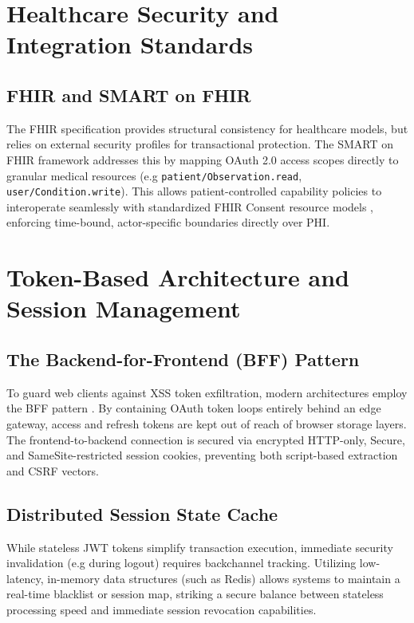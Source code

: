 \section{Healthcare Security and Integration Standards}

\subsection[FHIR and SMART on FHIR]{\texorpdfstring{\ac{FHIR}}{FHIR} and \texorpdfstring{\ac{SMART}}{SMART} on \texorpdfstring{\ac{FHIR}}{FHIR}}
The \ac{FHIR} specification \cite{fhirhl7} provides structural consistency for healthcare models, 
but relies on external security profiles for transactional protection. 
The \ac{SMART} on \ac{FHIR} framework \cite{smart_fhir} addresses this by mapping \ac{OAuth} 2.0 access scopes directly to granular medical resources (e.g \texttt{patient/Observation.read}, \texttt{user/Condition.write}). 
This allows patient-controlled capability policies to interoperate seamlessly with standardized \ac{FHIR} Consent resource models \cite{fhir_consent}, enforcing time-bound, actor-specific boundaries directly over \ac{PHI}.

\section{Token-Based Architecture and Session Management}

\subsection{The Backend-for-Frontend (BFF) Pattern}
To guard web clients against \ac{XSS} token exfiltration, modern architectures employ the \ac{BFF} pattern \cite{draft_bff}. 
By containing OAuth token loops entirely behind an edge gateway, access and refresh tokens are kept out of reach of browser storage layers. 
The frontend-to-backend connection is secured via encrypted HTTP-only, Secure, and SameSite-restricted session cookies, preventing both script-based extraction and \ac{CSRF} vectors.

\subsection{Distributed Session State Cache}
While stateless JWT tokens simplify transaction execution, immediate security invalidation (e.g during logout) requires backchannel tracking. 
Utilizing low-latency, in-memory data structures (such as Redis) allows systems to maintain a real-time blacklist or session map, striking a secure balance between stateless processing speed and immediate session revocation capabilities.

